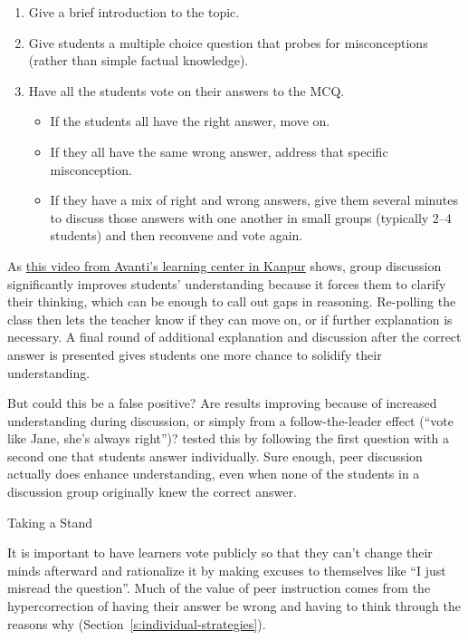 \begin{enumerate}
\item
  Give a brief introduction to the topic.
\item
  Give students a multiple choice question that probes for
  misconceptions (rather than simple factual knowledge).
\item
  Have all the students vote on their answers to the MCQ.

  \begin{itemize}
  \item
    If the students all have the right answer, move on.
  \item
    If they all have the same wrong answer, address that specific
    misconception.
  \item
    If they have a mix of right and wrong answers, give them several
    minutes to discuss those answers with one another in small
    groups (typically 2--4 students) and then reconvene and vote
    again.
  \end{itemize}
\end{enumerate}

As \href{https://www.youtube.com/watch?v=2LbuoxAy56o}{this video from Avanti's learning center in
Kanpur} shows, group discussion significantly
improves students' understanding because it forces them to clarify
their thinking, which can be enough to call out gaps in
reasoning. Re-polling the class then lets the teacher know if they can
move on, or if further explanation is necessary. A final round of
additional explanation and discussion after the correct answer is
presented gives students one more chance to solidify their
understanding.

But could this be a false positive? Are results improving because of
increased understanding during discussion, or simply from a
follow-the-leader effect (``vote like Jane, she's always right'')?
\cite{Smit2009} tested this by following the first question with a
second one that students answer individually. Sure enough, peer
discussion actually does enhance understanding, even when none of the
students in a discussion group originally knew the correct answer.

\begin{aside}{Taking a Stand}

It is important to have learners vote publicly so that they can't
change their minds afterward and rationalize it by making excuses to
themselves like ``I just misread the question''. Much of the value of
peer instruction comes from the hypercorrection of having their answer
be wrong and having to think through the reasons why
(Section~\ref{s:individual-strategies}).

\end{aside}

